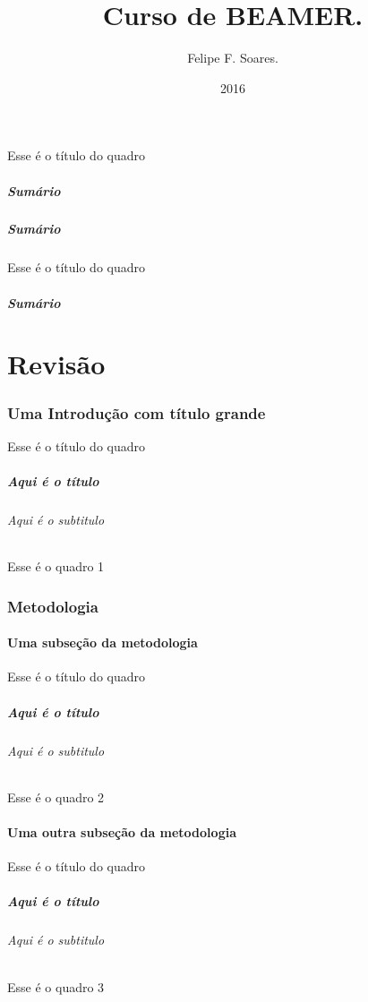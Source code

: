\documentclass{beamer}
\title{Curso de BEAMER.}
\author[Felipe]{Felipe F. Soares.}
\institute[UFC]{Universidade Federal do Ceará \\ ufc.br}
\date{2016}
\begin{document}
	\begin{frame}{Esse é o título do quadro}
		\titlepage
	\end{frame}
	
	\begin{frame}
		\frametitle{Sumário}
		\tableofcontents[part=1]
	\end{frame}
	
	\begin{frame}
		\frametitle{Sumário}
		\tableofcontents[part=2]
	\end{frame}
	
	\begin{frame}{Esse é o título do quadro}
		\frametitle{Sumário}
	\end{frame}
	
	\part{Revisão}
	\section[Introdução]{Uma Introdução com título grande}
	\begin{frame}{Esse é o título do quadro}
		\frametitle{Aqui é o título}
		\framesubtitle{Aqui é o subtitulo}
		Esse é o quadro 1
	\end{frame}
	
	\section{Metodologia}
	\subsection{Uma subseção da metodologia}
	\begin{frame}{Esse é o título do quadro}
		\frametitle{Aqui é o título}
		\framesubtitle{Aqui é o subtitulo}
		Esse é o quadro 2 %
	\end{frame}
	
	\subsection{Uma outra subseção da metodologia}
	\begin{frame}{Esse é o título do quadro}
		\frametitle{Aqui é o título}
		\framesubtitle{Aqui é o subtitulo}
		Esse é o quadro 3
	\end{frame}
	
\end{document}
